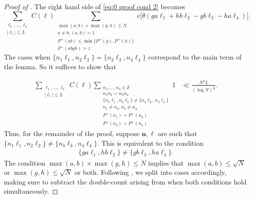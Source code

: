\documentclass[12pt]{amsart}
\renewcommand{\leq}{\leqslant}
\numberwithin{equation}{section}
\theoremstyle{plain}
\theoremstyle{definition}
\renewcommand{\l}{\ell}
\newcommand{\CS}{\mathcal{S}}
\begin{document}
\begin{proof}[Proof of ]
		The right hand side of \eqref{eq:0 proof cond 2} becomes
		\begin{equation}\label{eq lem cond 2: main sum to bound}
			\sum_{\substack{\l_1,\dots,\l_4 \\ |\l_i| \leq L}} C(\bm{\l}) \sum_{\substack{\max(a,b) \times \max(g,h) \leq N \\ a \ne b, (a,b) = 1 \\ P^+(ab) \leq \min\{P^+(g),P^+(h)\} \\ P^-(abgh) > z}} e\Big[\theta (ga\l_1+hb\l_2-gb\l_3-ha\l_4)\Big].
		\end{equation}
		The cases when $\{n_1\ell_1,n_2\ell_2\} =  \{n_3\ell_3,n_4\ell_4 \}$ correspond to the main term of the lemma. So it suffices to show that
		
		\begin{align*}
			\sum_{\substack{\l_1,\dots,\l_4 \\ |\l_i| \leq L}}C(\bm{\l}) \sum_{\substack{n_1,\dots,n_4 \in \CS \\ n_1n_2=n_3n_4 \\ \{n_1\l_1,n_2\l_2\}\ne\{n_3\l_3,n_4\l_4\} \\ n_1 \ne n_3,n_2 \ne n_4 \\ P^+(n_1)=P^+(n_3) \\ P^+(n_2) = P^+(n_4) }} 1 &\ll \frac{N^2L}{(\log N)^{ \frac{4}{5}}}.
		\end{align*}
		Thus, for the remainder of the proof, suppose $\bm{n},\bm{\l}$ are such that $\{n_1\l_1,n_2\l_2\} \ne \{n_3\l_3,n_4\l_4\}$. This is equivalent to the condition
		\begin{align}\label{eq lem cond 2: cond off diag}
			\{ga\l_1,hb\l_2\} \ne \{gb\l_3,ha\l_4\}.
		\end{align}
		The condition $\max(a,b) \times \max(g,h) \leq N$ implies that $\max(a,b) \leq \sqrt{N}$ or $\max(g,h) \leq \sqrt{N}$ or both. Following \cite{sound-xu-CLT}, we split into cases accordingly, making sure to subtract the double-count arising from when both conditions hold simultaneously.  
		

\end{proof}
\end{document}
